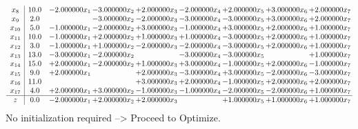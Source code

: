 \documentclass[10pt]{article}
\begin{document}
\[\begin{array}{c| c c@{\hskip 2pt} c@{\hskip 2pt} c@{\hskip 2pt} c@{\hskip 2pt} c@{\hskip 2pt} c@{\hskip 2pt} c@{\hskip 2pt} }
 x_{8}   &  10.0 & -2.000000 x_{1} & -3.000000 x_{2} & + 2.000000 x_{3} & -2.000000 x_{4} & + 2.000000 x_{5} & + 3.000000 x_{6} & + 2.000000 x_{7}\\
 x_{9}   &  2.0  &   & -3.000000 x_{2} & -2.000000 x_{3} & -3.000000 x_{4} & -3.000000 x_{5} & + 3.000000 x_{6} & + 2.000000 x_{7}\\
 x_{10}   &  5.0 & -1.000000 x_{1} & -2.000000 x_{2} & + 3.000000 x_{3} & -1.000000 x_{4} & + 3.000000 x_{5} & + 2.000000 x_{6} & + 1.000000 x_{7}\\
 x_{11}   &  10.0 & -1.000000 x_{1} & + 2.000000 x_{2} & + 1.000000 x_{3} & + 1.000000 x_{4} & -3.000000 x_{5} & + 2.000000 x_{6} & + 1.000000 x_{7}\\
 x_{12}   &  3.0 & -1.000000 x_{1} & + 1.000000 x_{2} & -2.000000 x_{3} & -2.000000 x_{4} & -3.000000 x_{5} & + 2.000000 x_{6} & + 1.000000 x_{7}\\
 x_{13}   &  13.0 & -3.000000 x_{1} & -2.000000 x_{2} &   & -3.000000 x_{4} & -3.000000 x_{5} &   & + 1.000000 x_{7}\\
 x_{14}   &  15.0 & + 2.000000 x_{1} & -2.000000 x_{2} & + 1.000000 x_{3} & + 3.000000 x_{4} & -1.000000 x_{5} & + 2.000000 x_{6} & -1.000000 x_{7}\\
 x_{15}   &  9.0 & + 2.000000 x_{1} &   & + 2.000000 x_{3} & -3.000000 x_{4} & + 3.000000 x_{5} & -2.000000 x_{6} & -3.000000 x_{7}\\
 x_{16}   &  11.0  &    &   & + 3.000000 x_{3} & + 2.000000 x_{4} & -1.000000 x_{5} & + 2.000000 x_{6} & + 2.000000 x_{7}\\
 x_{17}   &  4.0 & + 2.000000 x_{1} & + 3.000000 x_{2} & -1.000000 x_{3} & -1.000000 x_{4} & -2.000000 x_{5} & -2.000000 x_{6} & + 1.000000 x_{7}\\
\hline
z    &  0.0 & -2.000000 x_{1} & + 2.000000 x_{2} & + 2.000000 x_{3} &   & + 1.000000 x_{5} & + 1.000000 x_{6} & + 1.000000 x_{7}\\
\end{array}\]
No initialization required --> Proceed to Optimize. 
\end{document}
